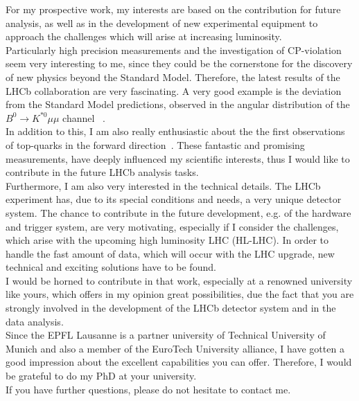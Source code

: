 \documentclass[10pt]{article}
\begin{document}
\noindent For my prospective work, my interests are based on the contribution for future analysis, as well as in the development of new experimental equipment to approach the challenges which will arise at increasing luminosity.\\
\noindent Particularly high precision measurements and the investigation of CP-violation seem very interesting to me, since they could be the cornerstone for the discovery of new physics beyond the Standard Model. Therefore, the latest results of the LHCb collaboration are very fascinating. A very good example is the deviation from the Standard Model predictions, observed in the angular distribution of the  $B^0\rightarrow K^{\ast 0}\mu\mu$ channel~\cite{Aaij:2015oid} .\\
\noindent In addition to this, I am also really enthusiastic about the  the first observations of top-quarks in the forward direction~\cite{Aaij:2015mwa}. These fantastic and promising  measurements, have deeply influenced my scientific interests,  thus I would like to contribute in the future LHCb analysis tasks.\\
\noindent Furthermore, I am also very interested in the technical details. The LHCb experiment has, due to  its special conditions and needs, a very unique detector system. The chance to contribute in the future development, e.g.  of the hardware and trigger system, are very motivating, especially if I consider the challenges, which  arise with the upcoming high luminosity LHC (HL-LHC). In order to handle the fast amount of data, which will occur with the LHC upgrade, new technical  and exciting solutions have to be found.\\
\clearpage
\noindent I would be horned to contribute in that work, especially at a renowned university like yours, which offers in my opinion great possibilities, due the fact that you are strongly involved in the development of the LHCb detector system and in the data analysis. \\ 
\noindent Since the EPFL Lausanne is a partner university of Technical University of Munich and also a member of the EuroTech University alliance, I have gotten a good impression about the excellent capabilities you can offer. Therefore, I would be grateful to do my PhD at your university.\\

\noindent If you have further questions, please do not hesitate to contact me.\\
\vspace{0.5cm}
\end{document}
